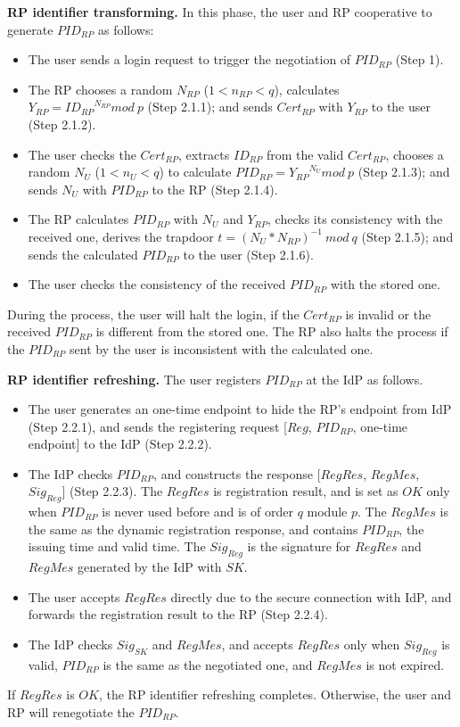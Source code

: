 \vspace{1mm}\noindent\textbf{RP identifier transforming.}
In this phase, the user and RP cooperative to generate $PID_{RP}$ as follows:
\begin{itemize}
  \item The user sends a login request to trigger the negotiation of $PID_{RP}$ (Step 1).
  \item The RP chooses a random $N_{RP}$ ($1 < n_{RP} <q$), calculates $Y_{RP}={ID_{RP}}^{N_{RP}} mod \ p$ (Step 2.1.1); and sends $Cert_{RP}$ with $Y_{RP}$ to the user (Step 2.1.2).
  \item The user checks the $Cert_{RP}$, extracts $ID_{RP}$ from the valid $Cert_{RP}$, chooses a random $N_U$ ($1 < n_U <q$) to calculate $PID_{RP}={Y_{RP}}^{N_{U}} mod \ p$ (Step 2.1.3); and sends $N_U$ with $PID_{RP}$ to the RP (Step 2.1.4).
  \item The RP calculates $PID_{RP}$ with $N_U$ and $Y_{RP}$, checks its consistency with the received one, derives the trapdoor $t={(N_U*N_{RP})}^{-1} \ mod \ q$ (Step 2.1.5); and sends the calculated $PID_{RP}$ to the user (Step 2.1.6).
  \item The user checks the consistency of the received $PID_{RP}$ with the stored one.
\end{itemize}
During the process, the user will halt the login, if  the $Cert_{RP}$ is invalid or the received $PID_{RP}$ is different from the stored one. The RP also halts the process if the $PID_{RP}$ sent by the user is inconsistent with the calculated one.

\vspace{1mm}\noindent\textbf{RP identifier refreshing.}
The user registers $PID_{RP}$ at the IdP as follows.
\begin{itemize}
  \item The user generates an one-time endpoint to hide the RP's endpoint from IdP (Step 2.2.1), and sends the registering request [$Reg$, $PID_{RP}$, one-time endpoint] to the IdP (Step 2.2.2).
  \item The IdP checks $PID_{RP}$, and constructs the response [$RegRes$, $RegMes$, $Sig_{Reg}$] (Step 2.2.3). The $RegRes$ is registration result, and is set as $OK$ only when $PID_{RP}$ is never used before and is of order $q$ module $p$. The $RegMes$ is the same as the dynamic registration response, and contains $PID_{RP}$, the issuing time and valid time. The $Sig_{Reg}$ is the signature for $RegRes$ and $RegMes$ generated by the IdP with $SK$.
  \item The user accepts $RegRes$ directly due to the secure connection with IdP, and forwards the registration result to the RP (Step 2.2.4).
  \item The IdP checks $Sig_{SK}$ and $RegMes$, and accepts $RegRes$ only when $Sig_{Reg}$ is valid, $PID_{RP}$ is the same as the negotiated one, and $RegMes$ is not expired.
\end{itemize}
If $RegRes$ is $OK$, the RP identifier refreshing completes. Otherwise, the user and RP will renegotiate the $PID_{RP}$.

